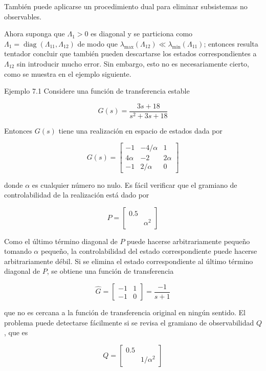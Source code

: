 También puede aplicarse un procedimiento dual para eliminar subsistemas no observables.

Ahora suponga que $\Lambda_{1}>0$ es diagonal y se particiona como $\Lambda_{1}=\operatorname{diag}\left(\Lambda_{11}, \Lambda_{12}\right)$ de modo que $\lambda_{\max }\left(\Lambda_{12}\right) \ll \lambda_{\min }\left(\Lambda_{11}\right)$; entonces resulta tentador concluir que también pueden descartarse los estados correspondientes a $\Lambda_{12}$ sin introducir mucho error. Sin embargo, esto no es necesariamente cierto, como se muestra en el ejemplo siguiente.

Ejemplo 7.1 Considere una función de transferencia estable

$$
G(s)=\frac{3 s+18}{s^{2}+3 s+18}
$$

Entonces $G(s)$ tiene una realización en espacio de estados dada por

$$
G(s)=\left[\begin{array}{cc|c}
-1 & -4 / \alpha & 1 \\
4 \alpha & -2 & 2 \alpha \\
\hline-1 & 2 / \alpha & 0
\end{array}\right]
$$

donde $\alpha$ es cualquier número no nulo. Es fácil verificar que el gramiano de controlabilidad de la realización está dado por

$$
P=\left[\begin{array}{ll}
0.5 & \\
& \alpha^{2}
\end{array}\right]
$$

Como el último término diagonal de $P$ puede hacerse arbitrariamente pequeño tomando $\alpha$ pequeño, la controlabilidad del estado correspondiente puede hacerse arbitrariamente débil. Si se elimina el estado correspondiente al último término diagonal de $P$, se obtiene una función de transferencia

$$
\hat{G}=\left[\begin{array}{c|c}
-1 & 1 \\
\hline-1 & 0
\end{array}\right]=\frac{-1}{s+1}
$$

que no es cercana a la función de transferencia original en ningún sentido. El problema puede detectarse fácilmente si se revisa el gramiano de observabilidad $Q$, que es

$$
Q=\left[\begin{array}{ll}
0.5 & \\
& 1 / \alpha^{2}
\end{array}\right]
$$


